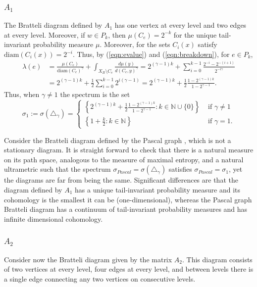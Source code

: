 \documentclass[12pt]{amsart}
\theoremstyle{plain}
\theoremstyle{definition}
\begin{document}
\subsubsection{$A_1$}
\label{subsubsec:simplest}
The Bratteli diagram defined by $A_1$ has one vertex at every level and two edges at every level. Moreover, if $w\in P_k$, then $\mu(C_e) = 2^{-k}$ for the unique tail-invariant probability measure $\mu$. Moreover, for the sets $C_i(x)$ satisfy $\mathrm{diam}(C_i(x)) = 2^{-i}$.
Thus, by (\ref{eqn:evalue}) and (\ref{eqn:breakdown}), for $e\in P_k$,
\begin{equation*}
\begin{split}
\lambda(e) &= \frac{\mu(C_e)}{\mathrm{diam}(C_e)^\gamma}+\int_{X_B\setminus C_e} \frac{d\mu(y)}{d(C_e,y)^\gamma}  = 2^{(\gamma-1)k}+ \sum_{i=0}^{k-1} \frac{2^{-i}-2^{-(i+1)}}{2^{-i\gamma}}\\
& = 2^{(\gamma-1)k}+ \frac12 \sum_{i=0}^{k-1} 2^{i(\gamma-1)} = 2^{(\gamma-1)k}+ \frac12 \frac{1-2^{(\gamma-1)k}}{1-2^{\gamma-1}}.
\end{split}
\end{equation*}
Thus, when $\gamma\neq 1$ the spectrum is the set
\begin{equation}
\label{eqn:spec1}
    \sigma_1:=\sigma(\triangle_\gamma) = \begin{cases}
        \left\{ 2^{(\gamma-1)k}+ \frac12 \frac{1-2^{(\gamma-1)k}}{1-2^{\gamma-1}} : k\in\mathbb{N}\cup \{0\}\right\} &\mbox{ if }\gamma\neq 1\\
        \left\{ 1+\frac{k}{2}:k\in\mathbb{N} \right\}&\mbox{ if }\gamma = 1 .
    \end{cases}
\end{equation}

Consider the Bratteli diagram defined by the Pascal graph \cite{Vershik:Pascal}, which is not a stationary diagram. It is straight forward to check that there is a natural measure on its path space, analogous to the measure of maximal entropy, and a natural ultrametric such that the spectrum $\sigma_{Pascal} = \sigma(\triangle_\gamma)$ satisfies $\sigma_{Pascal}= \sigma_1$, yet the diagrams are far from being the same. Significant differences are that the diagram defined by $A_1$ has a unique tail-invariant probability measure and its cohomology is the smallest it can be (one-dimensional), whereas the Pascal graph Bratteli diagram has a continuum of tail-invariant probability measures and has infinite dimensional cohomology.


\subsubsection{$A_2$}
Consider now the Bratteli diagram given by the matrix $A_2$. This diagram consists of two vertices at every level, four edges at every level, and between levels there is a single edge connecting any two vertices on consecutive levels.
\end{document}
